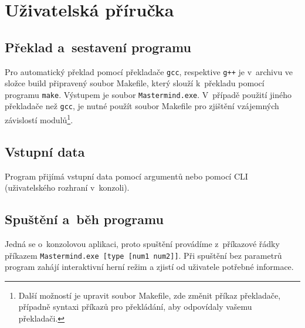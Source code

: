 \documentclass[12pt, a4paper]{article}
\begin{document}
\section{Uživatelská příručka} %

\subsection{Překlad a~sestavení programu}

Pro automatický překlad pomocí překladače \texttt{gcc}, respektive \texttt{g++} je v~archivu ve složce build připravený soubor Makefile, který slouží k~překladu pomocí programu \texttt{make}. Výstupem je soubor \texttt{Mastermind.exe}. V~případě použití jiného překladače než \texttt{gcc}, je nutné použít soubor Makefile pro zjištění vzájemných závislostí modulů\footnote{Další možností je upravit soubor Makefile, zde změnit příkaz překladače, případně syntaxi příkazů pro překládání, aby odpovídaly vašemu překladači.}.

\subsection{Vstupní data}
Program přijímá vstupní data pomocí argumentů nebo pomocí CLI (uživatelského rozhraní v~konzoli).

\subsection{Spuštění a~běh programu}

Jedná se o~konzolovou aplikaci, proto spuštění provádíme z~příkazové řádky příkazem \texttt{Mastermind.exe [type [num1 num2]]}. Při spuštění bez parametrů program zahájí interaktivní herní režim a zjistí od uživatele potřebné informace.
\end{document}
